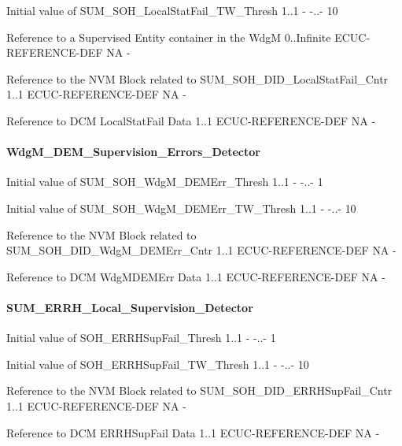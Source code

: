 {
{Initial value of SUM_SOH_LocalStatFail_TW_Thresh}
{1..1}
{-}
{-..-}
{10}}

{
{Reference to a Supervised Entity container in the WdgM}
{0..Infinite}
{ECUC-REFERENCE-DEF}
{NA}
{-}}

{
{Reference to the NVM Block related to SUM_SOH_DID_LocalStatFail_Cntr}
{1..1}
{ECUC-REFERENCE-DEF}
{NA}
{-}}

{
{Reference to DCM LocalStatFail Data}
{1..1}
{ECUC-REFERENCE-DEF}
{NA}
{-}}

\paragraph{WdgM\_DEM\_Supervision\_Errors\_Detector}
{
{Initial value of SUM_SOH_WdgM_DEMErr_Thresh}
{1..1}
{-}
{-..-}
{1}}


{
{Initial value of SUM_SOH_WdgM_DEMErr_TW_Thresh}
{1..1}
{-}
{-..-}
{10}}


{
{Reference to the NVM Block related to SUM_SOH_DID_WdgM_DEMErr_Cntr}
{1..1}
{ECUC-REFERENCE-DEF}
{NA}
{-}}

{
{Reference to DCM WdgMDEMErr Data}
{1..1}
{ECUC-REFERENCE-DEF}
{NA}
{-}}

\paragraph{SUM\_ERRH\_Local\_Supervision\_Detector}
{
{Initial value of SOH_ERRHSupFail_Thresh}
{1..1}
{-}
{-..-}
{1}}


{
{Initial value of SOH_ERRHSupFail_TW_Thresh}
{1..1}
{-}
{-..-}
{10}}


{
{Reference to the NVM Block related to SUM_SOH_DID_ERRHSupFail_Cntr}
{1..1}
{ECUC-REFERENCE-DEF}
{NA}
{-}}

{
{Reference to DCM ERRHSupFail Data}
{1..1}
{ECUC-REFERENCE-DEF}
{NA}
{-}}

